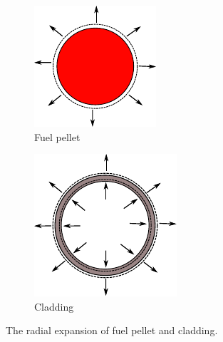 \begin{figure}
    \centering
    \begin{subfigure}[b]{0.25\textwidth}
        \centering
        \includegraphics[width=\textwidth]{figs/pellet_exp.pdf}
        \caption{Fuel pellet}
    \end{subfigure}
    \hspace{6em}
    \begin{subfigure}[b]{0.25\textwidth}
        \centering
        \includegraphics[width=\textwidth]{figs/clad_exp.pdf}
        \caption{Cladding}
    \end{subfigure}
    \caption{The radial expansion of fuel pellet and cladding.}
       \label{fig_31}
\end{figure}

